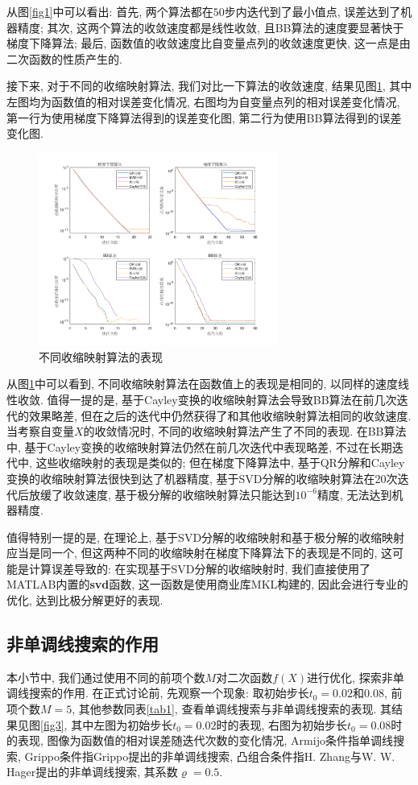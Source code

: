\documentclass[UTF8]{ctexart}
\begin{document}
从图\ref{fig1}中可以看出: 首先, 两个算法都在$50$步内迭代到了最小值点, 误差达到了机器精度; 其次, 这两个算法的收敛速度都是线性收敛, 且BB算法的速度要显著快于梯度下降算法; 最后, 函数值的收敛速度比自变量点列的收敛速度更快, 这一点是由二次函数的性质产生的. 

接下来, 对于不同的收缩映射算法, 我们对比一下算法的收敛速度, 结果见图\ref{fig2}, 其中左图均为函数值的相对误差变化情况, 右图均为自变量点列的相对误差变化情况, 第一行为使用梯度下降算法得到的误差变化图, 第二行为使用BB算法得到的误差变化图. 

\begin{figure}[htb]
    \centering
    \includegraphics[width=0.7\textwidth]{Q2-figure/2.png}
    \caption{不同收缩映射算法的表现}\label{fig2}
\end{figure}

从图\ref{fig2}中可以看到, 不同收缩映射算法在函数值上的表现是相同的, 以同样的速度线性收敛. 值得一提的是, 基于Cayley变换的收缩映射算法会导致BB算法在前几次迭代的效果略差, 但在之后的迭代中仍然获得了和其他收缩映射算法相同的收敛速度. 当考察自变量$X$的收敛情况时, 不同的收缩映射算法产生了不同的表现. 在BB算法中, 基于Cayley变换的收缩映射算法仍然在前几次迭代中表现略差, 不过在长期迭代中, 这些收缩映射的表现是类似的; 但在梯度下降算法中, 基于QR分解和Cayley变换的收缩映射算法很快到达了机器精度, 基于SVD分解的收缩映射算法在20次迭代后放缓了收敛速度, 基于极分解的收缩映射算法只能达到$10^{-6}$精度, 无法达到机器精度. 

值得特别一提的是, 在理论上, 基于SVD分解的收缩映射和基于极分解的收缩映射应当是同一个, 但这两种不同的收缩映射在梯度下降算法下的表现是不同的, 这可能是计算误差导致的: 在实现基于SVD分解的收缩映射时, 我们直接使用了MATLAB内置的\textbf{svd}函数, 这一函数是使用商业库MKL构建的, 因此会进行专业的优化, 达到比极分解更好的表现. 

\subsection{非单调线搜索的作用}
本小节中, 我们通过使用不同的前项个数$M$对二次函数$f(X)$进行优化, 探索非单调线搜索的作用. 在正式讨论前, 先观察一个现象: 取初始步长$t_0=0.02$和$0.08$, 前项个数$M=5$, 其他参数同表\ref{tab1}, 查看单调线搜索与非单调线搜索的表现. 其结果见图\ref{fig3}, 其中左图为初始步长$t_0=0.02$时的表现, 右图为初始步长$t_0=0.08$时的表现, 图像为函数值的相对误差随迭代次数的变化情况, Armijo条件指单调线搜索, Grippo条件指Grippo提出的非单调线搜索, 凸组合条件指H. Zhang与W. W. Hager提出的非单调线搜索, 其系数$\varrho=0.5$. 
\end{document}
